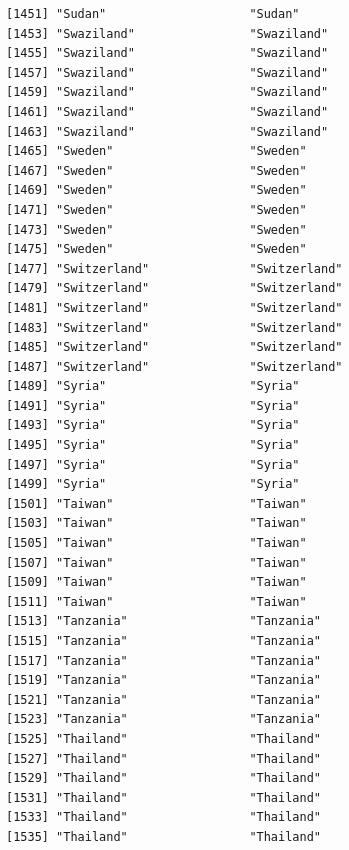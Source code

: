 \documentclass[
  letterpaper,
  DIV=11,
  numbers=noendperiod]{scrreprt}
\begin{document}
\begin{verbatim}
[1451] "Sudan"                    "Sudan"                   
[1453] "Swaziland"                "Swaziland"               
[1455] "Swaziland"                "Swaziland"               
[1457] "Swaziland"                "Swaziland"               
[1459] "Swaziland"                "Swaziland"               
[1461] "Swaziland"                "Swaziland"               
[1463] "Swaziland"                "Swaziland"               
[1465] "Sweden"                   "Sweden"                  
[1467] "Sweden"                   "Sweden"                  
[1469] "Sweden"                   "Sweden"                  
[1471] "Sweden"                   "Sweden"                  
[1473] "Sweden"                   "Sweden"                  
[1475] "Sweden"                   "Sweden"                  
[1477] "Switzerland"              "Switzerland"             
[1479] "Switzerland"              "Switzerland"             
[1481] "Switzerland"              "Switzerland"             
[1483] "Switzerland"              "Switzerland"             
[1485] "Switzerland"              "Switzerland"             
[1487] "Switzerland"              "Switzerland"             
[1489] "Syria"                    "Syria"                   
[1491] "Syria"                    "Syria"                   
[1493] "Syria"                    "Syria"                   
[1495] "Syria"                    "Syria"                   
[1497] "Syria"                    "Syria"                   
[1499] "Syria"                    "Syria"                   
[1501] "Taiwan"                   "Taiwan"                  
[1503] "Taiwan"                   "Taiwan"                  
[1505] "Taiwan"                   "Taiwan"                  
[1507] "Taiwan"                   "Taiwan"                  
[1509] "Taiwan"                   "Taiwan"                  
[1511] "Taiwan"                   "Taiwan"                  
[1513] "Tanzania"                 "Tanzania"                
[1515] "Tanzania"                 "Tanzania"                
[1517] "Tanzania"                 "Tanzania"                
[1519] "Tanzania"                 "Tanzania"                
[1521] "Tanzania"                 "Tanzania"                
[1523] "Tanzania"                 "Tanzania"                
[1525] "Thailand"                 "Thailand"                
[1527] "Thailand"                 "Thailand"                
[1529] "Thailand"                 "Thailand"                
[1531] "Thailand"                 "Thailand"                
[1533] "Thailand"                 "Thailand"                
[1535] "Thailand"                 "Thailand"                

\end{verbatim}
\end{document}
